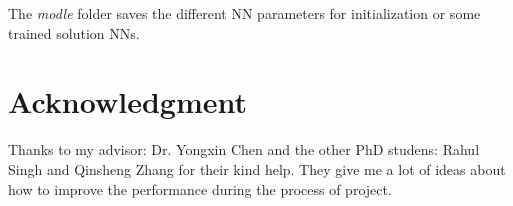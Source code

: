 \documentclass[conference,compsoc]{IEEEtran}
\begin{document}
The \textit{modle} folder saves the different NN parameters for initialization or some trained solution NNs.

\section*{Acknowledgment}

Thanks to my advisor: Dr. Yongxin Chen and the other PhD studens: Rahul Singh and Qinsheng Zhang for their kind help. They give me a lot of ideas about how to improve the performance during the process of project.



\end{document}
